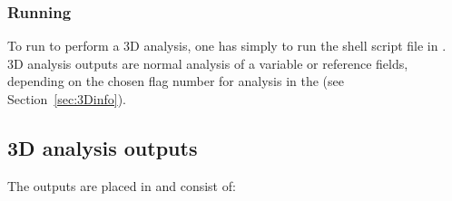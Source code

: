 \begin{center}
\end{center}



\subsubsection{Running }

To run \diva to perform a 3D analysis, one has simply to run the shell script file  in . \diva 3D analysis outputs are normal analysis of a variable or reference fields, depending on the chosen flag number for analysis in the  (see Section~\ref{sec:3Dinfo}).


\subsection{\diva 3D analysis outputs}

The outputs are placed in  and consist of:

